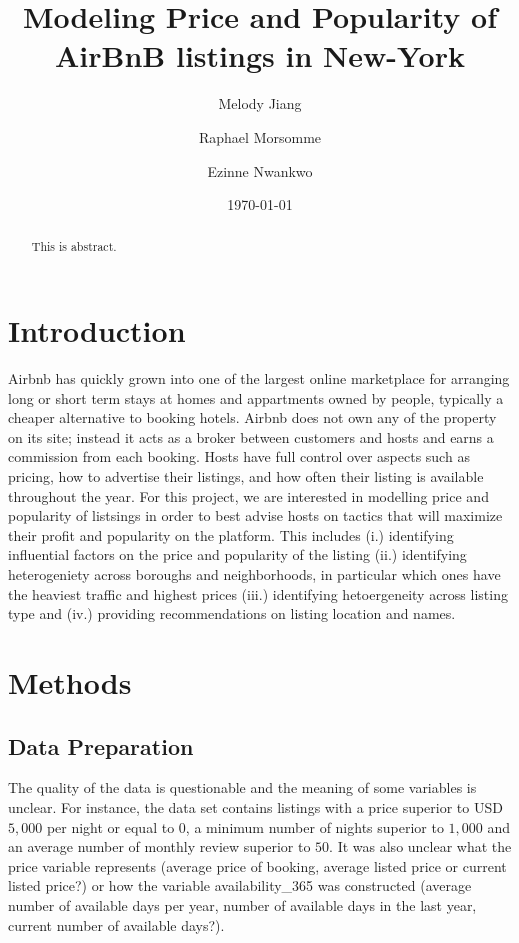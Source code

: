 \documentclass[10pt]{jmlr}%
\title[Modeling Price and Popularity of AirBnB listings in New-York]{Modeling Price and Popularity of AirBnB listings in New-York}	%
\author[Jiang, Morsomme, Nwankwo]{Melody Jiang \and Raphael Morsomme \and Ezinne Nwankwo}
\date{\today} %
\begin{document}
\maketitle

\begin{abstract}
This is abstract. 
\end{abstract}

\section{Introduction}
\label{sec:intro}

Airbnb has quickly grown into one of the largest online marketplace for arranging long or short term stays at homes and appartments owned by people, typically a cheaper alternative to booking hotels. Airbnb does not own any of the property on its site; instead it acts as a broker between customers and hosts and earns a commission from each booking. Hosts have full control over aspects such as pricing, how to advertise their listings, and how often their listing is available throughout the year. For this project, we are interested in modelling price and popularity of listsings in order to best advise hosts on tactics that will maximize their profit and popularity on the platform. This includes (i.) identifying influential factors on the price and popularity of the listing (ii.) identifying heterogeniety across boroughs and neighborhoods, in particular which ones have the heaviest traffic and highest prices (iii.) identifying hetoergeneity across listing type and (iv.) providing recommendations on listing location and names. 


\section{Methods}
\label{sec:method}

\subsection{Data Preparation}
\label{sec:data}
The quality of the data is questionable and the meaning of some variables is unclear. For instance, the data set contains listings with a price superior to USD$5,000$ per night or equal to $0$, a minimum number of nights superior to $1,000$ and an average number of monthly review superior to $50$. It was also unclear what the price variable represents (average price of booking, average listed price or current listed price?) or how the variable availability\_365 was constructed (average number of available days per year, number of available days in the last year, current number of available days?).
\end{document}
